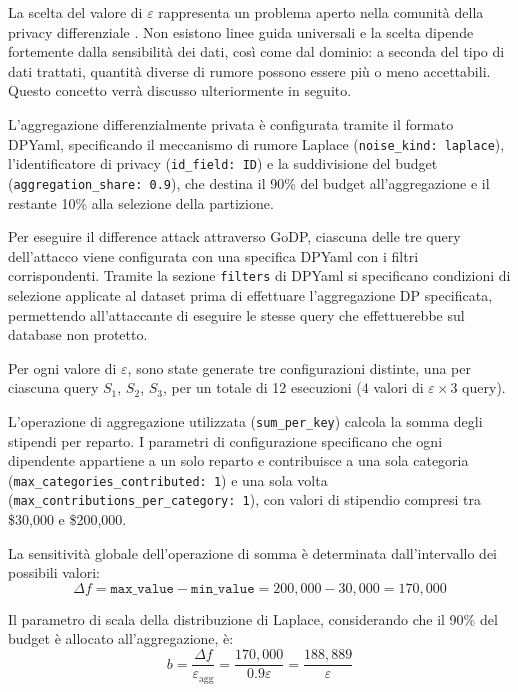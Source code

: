 La scelta del valore di $\varepsilon$ rappresenta un problema aperto nella comunità della privacy differenziale \cite{epsilonchoice}. Non esistono linee guida universali e la scelta dipende fortemente dalla sensibilità dei dati, così come dal dominio: a seconda del tipo di dati trattati, quantità diverse di rumore possono essere più o meno accettabili. Questo concetto verrà discusso ulteriormente in seguito.

L'aggregazione differenzialmente privata è configurata tramite il formato DPYaml, specificando il meccanismo di rumore Laplace (\texttt{noise\_kind: laplace}), l'identificatore di privacy (\texttt{id\_field: ID}) e la suddivisione del budget (\texttt{aggregation\_share: 0.9}), che destina il 90\% del budget all'aggregazione e il restante 10\% alla selezione della partizione.

Per eseguire il difference attack attraverso GoDP, ciascuna delle tre query dell'attacco viene configurata con una specifica DPYaml con i filtri corrispondenti. Tramite la sezione \texttt{filters} di DPYaml si specificano condizioni di selezione applicate al dataset prima di effettuare l'aggregazione DP specificata, permettendo all'attaccante di eseguire le stesse query che effettuerebbe sul database non protetto.

Per ogni valore di $\varepsilon$, sono state generate tre configurazioni distinte, una per ciascuna query $S_1$, $S_2$, $S_3$, per un totale di 12 esecuzioni ($4$ valori di $\varepsilon \times 3$ query).

L'operazione di aggregazione utilizzata (\texttt{sum\_per\_key}) calcola la somma degli stipendi per reparto. I parametri di configurazione specificano che ogni dipendente appartiene a un solo reparto e contribuisce a una sola categoria (\texttt{max\_categories\_contributed: 1}) e una sola volta (\texttt{max\_contributions\_per\_category: 1}), con valori di stipendio compresi tra \$30,000 e \$200,000.

La sensitività globale dell'operazione di somma è determinata dall'intervallo dei possibili valori:
\begin{equation}
    \Delta f = \texttt{max\_value} - \texttt{min\_value} = 200{,}000 - 30{,}000 = 170{,}000
    \label{eq:exp_sensitivity}
\end{equation}

Il parametro di scala della distribuzione di Laplace, considerando che il 90\% del budget è allocato all'aggregazione, è:
\begin{equation}
    b = \frac{\Delta f}{\varepsilon_{\text{agg}}} = \frac{170{,}000}{0.9\varepsilon} = \frac{188{,}889}{\varepsilon}
    \label{eq:laplace_scale}
\end{equation}


